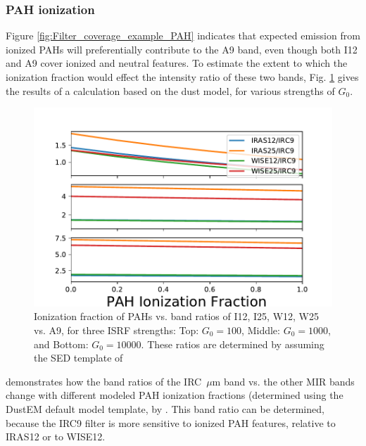       \subsubsection{PAH ionization}
      Figure \ref{fig:Filter_coverage_example_PAH} indicates that expected emission from ionized PAHs will preferentially contribute to the A9 band, even though both I12 and A9 cover ionized and neutral features. To estimate the extent to which the ionization fraction would effect the intensity ratio of these two bands, Fig. \ref{fig:inband_ionfrac_ratios} gives the results of a calculation based on the \cite{drli01} dust model, for various strengths of $G_{0}$.
      \begin{figure}
          \centering
          \includegraphics[width=150mm]{../Plots/band-ratio-multiple.pdf}
          \caption{Ionization fraction of PAHs vs. band ratios of I12, I25, W12, W25 vs. A9, for three ISRF strengths: Top: $G_{0} = 100$, Middle: $G_{0} = 1000$, and Bottom: $G_{0} = 10000$. These ratios are determined by assuming the SED template of \cite{dustem11} }
          \label{fig:inband_ionfrac_ratios}
      \end{figure}
         demonstrates how the band ratios of the IRC~$\mu$m band vs. the other MIR bands change with different modeled PAH ionization fractions (determined using the DustEM default model template, by \cite{dustem11}. This band ratio can be determined, because the IRC9 filter is more sensitive to ionized PAH features, relative to IRAS12 or to WISE12.
